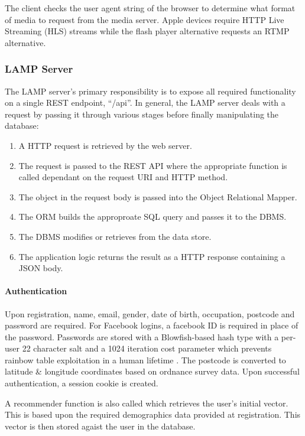 The client checks the user agent string of the browser to determine what format of media to request from the media server. Apple devices require HTTP Live Streaming (HLS) streams while the flash player alternative requests an RTMP alternative.

\subsubsection{LAMP Server}

The LAMP server's primary responsibility is to expose all required functionality on a single REST endpoint, ``/api''. In general, the LAMP server deals with a request by passing it through various stages before finally manipulating the database:

\begin{enumerate}
	\item A HTTP request is retrieved by the web server.
	\item The request is passed to the REST API where the appropriate function is called dependant on the request URI and HTTP method.
	\item The object in the request body is passed into the Object Relational Mapper.
	\item The ORM builds the approproate SQL query and passes it to the DBMS.
	\item The DBMS modifies or retrieves from the data store.
	\item The application logic returns the result as a HTTP response containing a JSON body.
\end{enumerate}

\paragraph{Authentication}

Upon registration, name, email, gender, date of birth, occupation, postcode and password are required. For Facebook logins, a facebook ID is required in place of the password. Passwords are stored with a Blowfish-based hash type with a per-user 22 character salt and a 1024 iteration cost parameter which prevents rainbow table exploitation in a human lifetime \citep{hashing}. The postcode is converted to latitude \& longitude coordinates based on ordnance survey data. Upon successful authentication, a session cookie is created.

A recommender function is also called which retrieves the user's initial vector. This is based upon the required demographics data provided at registration. This vector is then stored agaist the user in the database.

